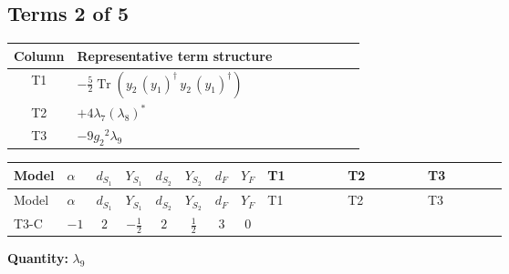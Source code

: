 \documentclass[8pt]{article}
\begin{document}
\begin{landscape}
\subsection*{Terms 2 of 5}
\begin{center}
\begin{tabular}{@{}c >{\raggedright\arraybackslash}p{0.82\linewidth}@{}}
\toprule
Column & Representative term structure \\
\midrule
T1 & \(\displaystyle -\frac{5}{2} \operatorname{Tr}\!\left({y_2}\,\left({y_1}\right)^{\dagger}\,{y_2}\,\left({y_1}\right)^{\dagger}\right)\) \\
\midrule
T2 & \(\displaystyle +4 {\lambda_{7}} \left({\lambda_{8}}\right)^{*}\) \\
\midrule
T3 & \(\displaystyle -9 {g_2}^2 {\lambda_{9}}\) \\
\midrule
\bottomrule
\end{tabular}
\end{center}
\smallskip
\tiny
\begin{longtable}{@{}llcccccc >{\raggedright\arraybackslash}p{0.21\linewidth} >{\raggedright\arraybackslash}p{0.21\linewidth} >{\raggedright\arraybackslash}p{0.21\linewidth}@{}}
\toprule
Model & $\alpha$ & $d_{S_1}$ & $Y_{S_1}$ & $d_{S_2}$ & $Y_{S_2}$ & $d_F$ & $Y_F$ & T1 & T2 & T3 \\
\midrule
\endfirsthead
\toprule
Model & $\alpha$ & $d_{S_1}$ & $Y_{S_1}$ & $d_{S_2}$ & $Y_{S_2}$ & $d_F$ & $Y_F$ & T1 & T2 & T3 \\
\midrule
\endhead
T3-C & $-1$ & $2$ & $-\frac{1}{2}$ & $2$ & $\frac{1}{2}$ & $3$ & $0$ & \scriptsize\adjustbox{max width=\linewidth}{$\begin{gathered} -\frac{5}{2} \operatorname{Tr}\!\left({y_2}\,\left({y_1}\right)^{\dagger}\,{y_2}\,\left({y_1}\right)^{\dagger}\right)\end{gathered}$} & \scriptsize\adjustbox{max width=\linewidth}{$\begin{gathered} +4 {\lambda_{7}} \left({\lambda_{8}}\right)^{*}\end{gathered}$} & \scriptsize\adjustbox{max width=\linewidth}{$\begin{gathered} -9 {g_2}^2 {\lambda_{9}}\end{gathered}$} \\
\midrule
\bottomrule
\end{longtable}
\clearpage
\noindent\textbf{Quantity: }$\lambda_{9}$\par\smallskip

\end{landscape}
\end{document}
